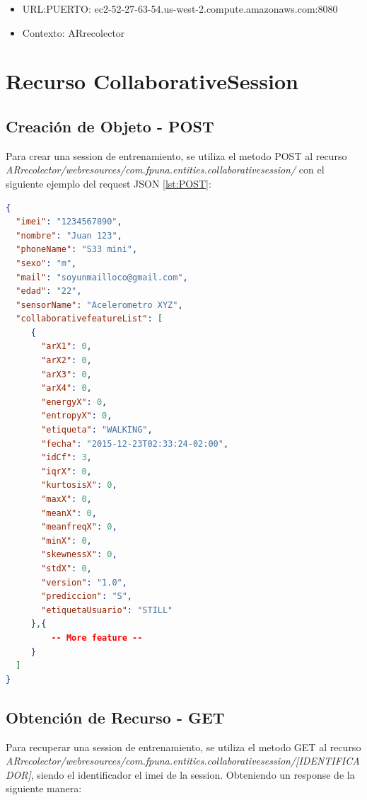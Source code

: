 \begin{itemize}
	\item URL:PUERTO: ec2-52-27-63-54.us-west-2.compute.amazonaws.com:8080
	\item Contexto: ARrecolector
\end{itemize}



\section{Recurso CollaborativeSession}

\subsection{Creación de Objeto - POST}

Para crear una session de entrenamiento, se utiliza el metodo POST al recurso \textit{ARrecolector/webresources/com.fpuna.entities.collaborativesession/} con el siguiente ejemplo del request JSON \ref{lst:POST}:

\begin{lstlisting}[language=json,firstnumber=1,label={lst:POST}]
{
  "imei": "1234567890",
  "nombre": "Juan 123",
  "phoneName": "S33 mini",
  "sexo": "m",
  "mail": "soyunmailloco@gmail.com",
  "edad": "22",
  "sensorName": "Acelerometro XYZ",
  "collaborativefeatureList": [
     {
       "arX1": 0,
       "arX2": 0,
       "arX3": 0,
       "arX4": 0,
       "energyX": 0,
       "entropyX": 0,
       "etiqueta": "WALKING",
       "fecha": "2015-12-23T02:33:24-02:00",
       "idCf": 3,
       "iqrX": 0,
       "kurtosisX": 0,
       "maxX": 0,
       "meanX": 0,
       "meanfreqX": 0,
       "minX": 0,
       "skewnessX": 0,
       "stdX": 0,
       "version": "1.0",
       "prediccion": "S",
       "etiquetaUsuario": "STILL"
     },{ 
	     -- More feature -- 
     }  
  ]
}
\end{lstlisting}

\subsection{Obtención de Recurso - GET}

Para recuperar una session de entrenamiento, se utiliza el metodo GET al recurso \textit{ARrecolector/webresources/com.fpuna.entities.collaborativesession/[IDENTIFICADOR]}, siendo el identificador el imei de la session. Obteniendo un response de la siguiente manera:

